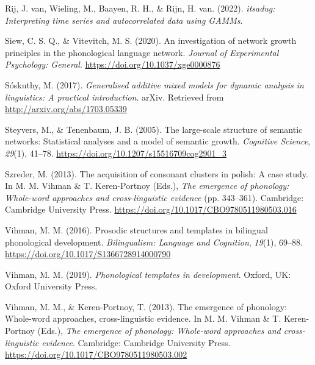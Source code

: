 \documentclass[
  man]{apa6}
\newlength{\cslhangindent}
\newlength{\cslentryspacingunit} %
\newenvironment{CSLReferences}[2] %
 {%
  \setlength{\parindent}{0pt}
  \ifodd #1
  \let\oldpar\par
  \def\par{\hangindent=\cslhangindent\oldpar}
  \fi
  \setlength{\parskip}{#2\cslentryspacingunit}
 }%
 {}
\begin{document}
\begin{CSLReferences}{1}{0}
\leavevmode{}%
Rij, J. van, Wieling, M., Baayen, R. H., \& Rijn, H. van. (2022). \emph{{itsadug}: Interpreting time series and autocorrelated data using GAMMs}.

\leavevmode{}%
Siew, C. S. Q., \& Vitevitch, M. S. (2020). An investigation of network growth principles in the phonological language network. \emph{Journal of Experimental Psychology: General}. \url{https://doi.org/10.1037/xge0000876}

\leavevmode{}%
Sóskuthy, M. (2017). \emph{Generalised additive mixed models for dynamic analysis in linguistics: A practical introduction}. arXiv. Retrieved from \url{http://arxiv.org/abs/1703.05339}

\leavevmode{}%
Steyvers, M., \& Tenenbaum, J. B. (2005). The large-scale structure of semantic networks: Statistical analyses and a model of semantic growth. \emph{Cognitive Science}, \emph{29}(1), 41--78. \url{https://doi.org/10.1207/s15516709cog2901_3}

\leavevmode{}%
Szreder, M. (2013). The acquisition of consonant clusters in polish: A case study. In M. M. Vihman \& T. Keren-Portnoy (Eds.), \emph{The emergence of phonology: Whole-word approaches and cross-linguistic evidence} (pp. 343--361). Cambridge: Cambridge University Press. \url{https://doi.org/10.1017/CBO9780511980503.016}

\leavevmode{}%
Vihman, M. M. (2016). Prosodic structures and templates in bilingual phonological development. \emph{Bilingualism: Language and Cognition}, \emph{19}(1), 69--88. \url{https://doi.org/10.1017/S1366728914000790}

\leavevmode{}%
Vihman, M. M. (2019). \emph{Phonological templates in development}. Oxford, {UK}: Oxford University Press.

\leavevmode{}%
Vihman, M. M., \& Keren-Portnoy, T. (2013). The emergence of phonology: Whole-word approaches, cross-linguistic evidence. In M. M. Vihman \& T. Keren-Portnoy (Eds.), \emph{The emergence of phonology: Whole-word approaches and cross-linguistic evidence}. Cambridge: Cambridge University Press. \url{https://doi.org/10.1017/CBO9780511980503.002}


\end{CSLReferences}
\end{document}
